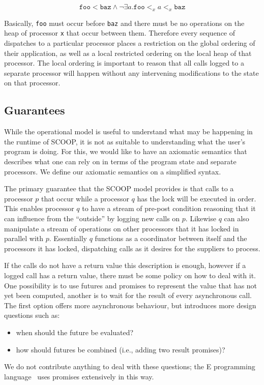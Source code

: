 \documentclass[a4]{article}
\begin{document}
\[
\mathtt{foo} < \mathtt{baz} \wedge
\neg \exists a . \mathtt{foo} <_x a <_x \mathtt{baz}
\]

Basically, \texttt{foo} must occur before \texttt{baz} and
there must be no operations on the heap of processor \texttt{x}
that occur between them.
Therefore every sequence of dispatches to a particular processor
places a restriction on the global ordering of their application,
as well as a local restricted ordering on the local heap of that processor.
The local ordering is important to reason that all calls logged
to a separate processor will happen without any
intervening modifications to the state on that processor.

\subsection{Guarantees}
While the operational model is useful to understand what may be happening
in the runtime of SCOOP,
it is not as suitable to understanding what the user's program
is doing.
For this, we would like to have an axiomatic semantics that describes
what one can rely on in terms of the program state and separate processors.
We define our axiomatic semantics on a simplified syntax.


The primary guarantee that the SCOOP model provides is that calls to a
processor $p$ that occur while a processor $q$ has the lock
will be executed in order.
This enables processor $q$ to have
a stream of pre-post condition reasoning that
it can influence from the ``outside'' by logging new calls on $p$.
Likewise $q$ can also manipulate a stream of operations on other
processors that it has locked in parallel with $p$.
Essentially $q$ functions as a coordinator between itself
and the processors it has locked,
dispatching calls as it desires for the suppliers to process.

If the calls do not have a return value this description is enough,
however if a logged call has a return value,
there must be some policy on how to deal with it.
One possibility is to use futures and promises to represent the value that has
not yet been computed,
another is to wait for the result of every asynchronous call.
The first option offers more asynchronous behaviour,
but introduces more design questions such as:

\begin{itemize}
\item when should the future be evaluated?
\item how should futures be combined (i.e., adding two result promises)?
\end{itemize}
We do not contribute anything to deal with these questions;
the E programming language~\cite{miller:2006:robust_composition}
uses promises extensively in this way.
\end{document}
